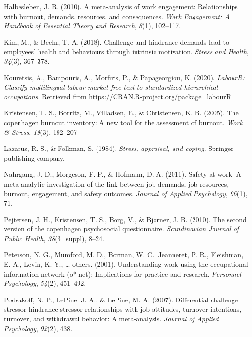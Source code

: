 \documentclass[
  english,
  man]{apa6}
\begin{document}
\leavevmode\hypertarget{ref-halbesleben2010meta}{}%
Halbesleben, J. R. (2010). A meta-analysis of work engagement: Relationships with burnout, demands, resources, and consequences. \emph{Work Engagement: A Handbook of Essential Theory and Research}, \emph{8}(1), 102--117.

\leavevmode\hypertarget{ref-kim2018challenge}{}%
Kim, M., \& Beehr, T. A. (2018). Challenge and hindrance demands lead to employees' health and behaviours through intrinsic motivation. \emph{Stress and Health}, \emph{34}(3), 367--378.

\leavevmode\hypertarget{ref-R-labourR}{}%
Kouretsis, A., Bampouris, A., Morfiris, P., \& Papageorgiou, K. (2020). \emph{LabourR: Classify multilingual labour market free-text to standardized hierarchical occupations}. Retrieved from \url{https://CRAN.R-project.org/package=labourR}

\leavevmode\hypertarget{ref-kristensen2005copenhagen}{}%
Kristensen, T. S., Borritz, M., Villadsen, E., \& Christensen, K. B. (2005). The copenhagen burnout inventory: A new tool for the assessment of burnout. \emph{Work \& Stress}, \emph{19}(3), 192--207.

\leavevmode\hypertarget{ref-lazarus1984stress}{}%
Lazarus, R. S., \& Folkman, S. (1984). \emph{Stress, appraisal, and coping}. Springer publishing company.

\leavevmode\hypertarget{ref-nahrgang2011safety}{}%
Nahrgang, J. D., Morgeson, F. P., \& Hofmann, D. A. (2011). Safety at work: A meta-analytic investigation of the link between job demands, job resources, burnout, engagement, and safety outcomes. \emph{Journal of Applied Psychology}, \emph{96}(1), 71.

\leavevmode\hypertarget{ref-pejtersen2010second}{}%
Pejtersen, J. H., Kristensen, T. S., Borg, V., \& Bjorner, J. B. (2010). The second version of the copenhagen psychosocial questionnaire. \emph{Scandinavian Journal of Public Health}, \emph{38}(3\_suppl), 8--24.

\leavevmode\hypertarget{ref-peterson2001understanding}{}%
Peterson, N. G., Mumford, M. D., Borman, W. C., Jeanneret, P. R., Fleishman, E. A., Levin, K. Y., \ldots{} others. (2001). Understanding work using the occupational information network (o* net): Implications for practice and research. \emph{Personnel Psychology}, \emph{54}(2), 451--492.

\leavevmode\hypertarget{ref-podsakoff2007differential}{}%
Podsakoff, N. P., LePine, J. A., \& LePine, M. A. (2007). Differential challenge stressor-hindrance stressor relationships with job attitudes, turnover intentions, turnover, and withdrawal behavior: A meta-analysis. \emph{Journal of Applied Psychology}, \emph{92}(2), 438.
\end{document}
